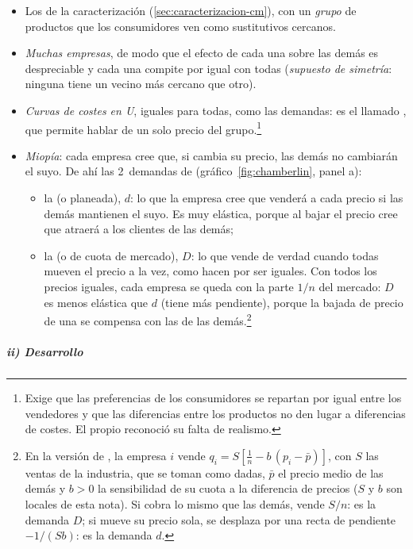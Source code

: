 \documentclass[11pt]{article}
\begin{document}
\begin{itemize}
\item Los de la caracterización (\ref{sec:caracterizacion-cm}), con un \emph{grupo} de productos que los consumidores ven como sustitutivos cercanos.
\item \emph{Muchas empresas}, de modo que el efecto de cada una sobre las demás es despreciable y cada una compite por igual con todas (\emph{supuesto de simetría}: ninguna tiene un vecino más cercano que otro).
\item \emph{Curvas de costes en U}, iguales para todas, como las demandas: es el llamado , que permite hablar de un solo precio del grupo.\footnote{Exige que las preferencias de los consumidores se repartan por igual entre los vendedores y que las diferencias entre los productos no den lugar a diferencias de costes. El propio  reconoció su falta de realismo.}
\item \emph{Miopía}: cada empresa cree que, si cambia su precio, las demás no cambiarán el suyo. De ahí las 2~demandas de  (gráfico~\ref{fig:chamberlin}, panel a):
  \begin{itemize}
  \item la  (o planeada), $d$: lo que la empresa cree que venderá a cada precio si las demás mantienen el suyo. Es muy elástica, porque al bajar el precio cree que atraerá a los clientes de las demás;
  \item la  (o de cuota de mercado), $D$: lo que vende de verdad cuando todas mueven el precio a la vez, como hacen por ser iguales. Con todos los precios iguales, cada empresa se queda con la parte $1/n$ del mercado: $D$ es menos elástica que $d$ (tiene más pendiente), porque la bajada de precio de una se compensa con las de las demás.\footnote{En la versión de \textcite[cap.~8]{KrugmanObstfeldMelitz2018International}, la empresa $i$ vende $q_i=S\left[\frac{1}{n}-b\,(p_i-\bar{p})\right]$, con $S$ las ventas de la industria, que se toman como dadas, $\bar{p}$ el precio medio de las demás y $b>0$ la sensibilidad de su cuota a la diferencia de precios ($S$ y $b$ son locales de esta nota). Si cobra lo mismo que las demás, vende $S/n$: es la demanda $D$; si mueve su precio sola, se desplaza por una recta de pendiente $-1/(Sb)$: es la demanda $d$.}
  \end{itemize}
\end{itemize}

\subparagraph{ii) Desarrollo}
\end{document}
